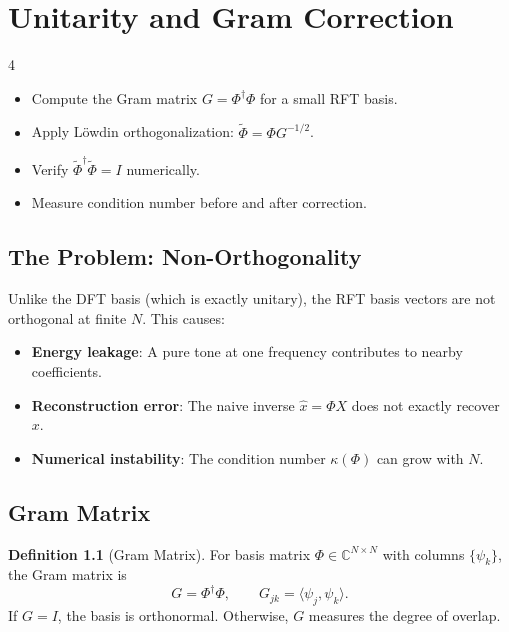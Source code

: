 \documentclass[11pt, a4paper, openany]{book}
\theoremstyle{definition}
\newtheorem{definition}{Definition}[chapter]
\begin{document}
\chapter{Unitarity and Gram Correction}

\begin{todobox}{4}
\begin{itemize}
    \item[$\square$] Compute the Gram matrix $G = \Phi^\dagger \Phi$ for a small RFT basis.
    \item[$\square$] Apply Löwdin orthogonalization: $\tilde{\Phi} = \Phi G^{-1/2}$.
    \item[$\square$] Verify $\tilde{\Phi}^\dagger \tilde{\Phi} = I$ numerically.
    \item[$\square$] Measure condition number before and after correction.
\end{itemize}
\end{todobox}

\section{The Problem: Non-Orthogonality}
Unlike the DFT basis (which is exactly unitary), the RFT basis vectors are not orthogonal at finite $N$. This causes:
\begin{itemize}
    \item \textbf{Energy leakage}: A pure tone at one frequency contributes to nearby coefficients.
    \item \textbf{Reconstruction error}: The naive inverse $\hat{x} = \Phi X$ does not exactly recover $x$.
    \item \textbf{Numerical instability}: The condition number $\kappa(\Phi)$ can grow with $N$.
\end{itemize}

\section{Gram Matrix}
\begin{definition}[Gram Matrix]
For basis matrix $\Phi \in \mathbb{C}^{N \times N}$ with columns $\{\psi_k\}$, the Gram matrix is
\begin{equation}
G = \Phi^\dagger \Phi, \qquad G_{jk} = \langle \psi_j, \psi_k \rangle.
\end{equation}
If $G = I$, the basis is orthonormal. Otherwise, $G$ measures the degree of overlap.
\end{definition}
\end{document}
